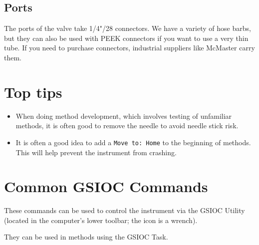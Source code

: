 \documentclass[11pt, oneside]{article}   	%
\begin{document}
\begin{enumerate}
\subsection{Ports}
The ports of the valve take 1/4"/28 connectors. We have a variety of hose barbs, but they can also be used with PEEK connectors if you want to use a very thin tube. If you need to purchase connectors, industrial suppliers like McMaster carry them.

\section{Top tips}
\begin{itemize}
	\item When doing method development, which involves testing of unfamiliar methods, it is often good to remove the needle to avoid needle stick risk.
	\item It is often a good idea to add a \texttt{Move to: Home} to the beginning of methods. This will help prevent the instrument from crashing. 
\end{itemize}

\end{enumerate}

\section{Common GSIOC Commands}
These commands can be used to control the instrument via the GSIOC Utility (located in the computer's lower toolbar; the icon is a wrench).

They can be used in methods using the GSIOC Task.
\end{document}
